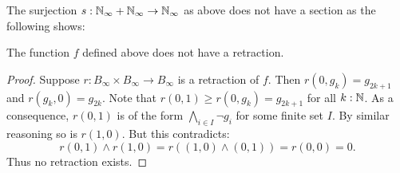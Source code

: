 The surjection $s:\mathbb{N}_{\infty} + \mathbb{N}_{\infty} \to \mathbb{N}_{\infty}$ as above does not have a section 
as the following shows:
\begin{lemma}
  The function $f$ defined above does not have a retraction. 
\end{lemma}
\begin{proof}
  Suppose $r:B_\infty \times B_\infty \to B_\infty$ is a retraction of $f$. 
  Then $r(0,g_k) = g_{2k+1}$ and $r(g_k,0) = g_{2k}$. 
  Note that $r(0,1) \geq r(0,g_k) = g_{2k+1}$ for all $k:\mathbb{N}$. 
  As a consequence, $r(0,1)$ is of the form $\bigwedge_{i\in I} \neg g_i$ for some finite set $I$.
  By similar reasoning so is $r(1,0)$. %
  But this contradicts:
  \[r(0,1) \wedge r(1,0) = r( (1,0) \wedge (0,1)) = r(0,0) = 0.\]
  Thus no retraction exists. 
\end{proof}


